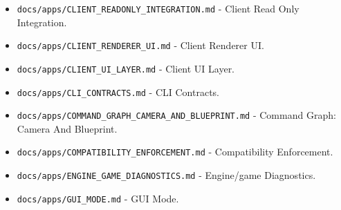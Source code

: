\documentclass[9pt,a4paper,openany]{book}
\begin{document}
\begin{itemize}
\item \texttt{docs/\allowbreak{}apps/\allowbreak{}CLIENT\_\allowbreak{}READONLY\_\allowbreak{}INTEGRATION.\allowbreak{}md} -\allowbreak{} Client Read Only Integration.\allowbreak{}
\end{itemize}

\begin{itemize}
\item \texttt{docs/\allowbreak{}apps/\allowbreak{}CLIENT\_\allowbreak{}RENDERER\_\allowbreak{}UI.\allowbreak{}md} -\allowbreak{} Client Renderer UI.\allowbreak{}
\end{itemize}

\begin{itemize}
\item \texttt{docs/\allowbreak{}apps/\allowbreak{}CLIENT\_\allowbreak{}UI\_\allowbreak{}LAYER.\allowbreak{}md} -\allowbreak{} Client UI Layer.\allowbreak{}
\end{itemize}

\begin{itemize}
\item \texttt{docs/\allowbreak{}apps/\allowbreak{}CLI\_\allowbreak{}CONTRACTS.\allowbreak{}md} -\allowbreak{} CLI Contracts.\allowbreak{}
\end{itemize}

\begin{itemize}
\item \texttt{docs/\allowbreak{}apps/\allowbreak{}COMMAND\_\allowbreak{}GRAPH\_\allowbreak{}CAMERA\_\allowbreak{}AND\_\allowbreak{}BLUEPRINT.\allowbreak{}md} -\allowbreak{} Command Graph: Camera And Blueprint.\allowbreak{}
\end{itemize}

\begin{itemize}
\item \texttt{docs/\allowbreak{}apps/\allowbreak{}COMPATIBILITY\_\allowbreak{}ENFORCEMENT.\allowbreak{}md} -\allowbreak{} Compatibility Enforcement.\allowbreak{}
\end{itemize}

\begin{itemize}
\item \texttt{docs/\allowbreak{}apps/\allowbreak{}ENGINE\_\allowbreak{}GAME\_\allowbreak{}DIAGNOSTICS.\allowbreak{}md} -\allowbreak{} Engine/\allowbreak{}game Diagnostics.\allowbreak{}
\end{itemize}

\begin{itemize}
\item \texttt{docs/\allowbreak{}apps/\allowbreak{}GUI\_\allowbreak{}MODE.\allowbreak{}md} -\allowbreak{} GUI Mode.\allowbreak{}
\end{itemize}
\end{document}
